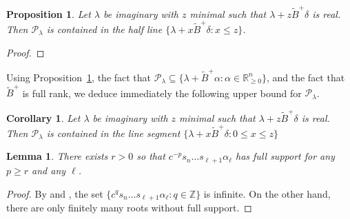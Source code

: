 \documentclass{amsart}
\newtheorem{corollary}[theorem]{Corollary}
\newtheorem{lemma}[theorem]{Lemma}
\newtheorem{proposition}[theorem]{Proposition}
\numberwithin{theorem}{section}
\newcommand{\cP}{\mathcal{P}}
\newcommand{\RR}{\mathbb{R}}
\newcommand{\ZZ}{\mathbb{Z}}
\begin{document}
  \begin{proposition}
    \label{prop:ray upperbound}
    Let $\lambda$ be imaginary with $z$ minimal such that $\lambda+z\widetilde B^+\delta$ is real.
    Then $\cP_\lambda$ is contained in the half line $\{\lambda+x\widetilde B^+\delta: x\le z\}$.
  \end{proposition}
  \begin{proof}
  \end{proof}
  
  Using Proposition~\ref{prop:ray upperbound}, the fact that $\cP_\lambda\subseteq \{\lambda + \widetilde B^+ \alpha : \alpha \in  \RR_{\ge0}^n\}$, and the fact that $\widetilde B^+$ is full rank, we deduce immediately the following upper bound for $\cP_\lambda$.
  \begin{corollary}
    \label{cor:upperbound}
    Let $\lambda$ be imaginary with $z$ minimal such that $\lambda+z\widetilde B^+\delta$ is real.
    Then $\cP_\lambda$ is contained in the line segment $\{\lambda+x\widetilde B^+\delta: 0\le x\le z\}$
  \end{corollary}

  \begin{lemma}
    \label{le:coxeter power}
    There exists $r>0$ so that $c^{-p} s_n \ldots s_{\ell+1} \alpha_\ell$ has full support for any $p\ge r$ and any $\ell$.
  \end{lemma}
  \begin{proof}
    By \cite[Theorem 1.2(1)]{Reading-Stella} and \cite[Section 1]{Dlab-Ringel}, the set $\{c^q s_n \ldots s_{\ell+1} \alpha_\ell:q\in\ZZ\}$ is infinite.
    On the other hand, there are only finitely many roots without full support.
  \end{proof}
  
\end{document}
